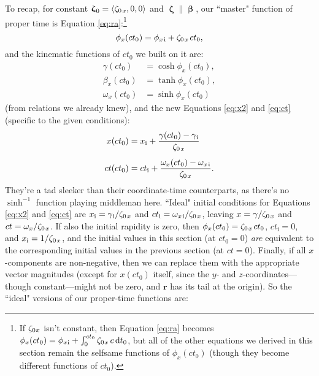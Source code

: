 \documentclass[12pt]{article}
\renewcommand{\vv}[1]{\mathbf{#1}}
\newcommand{\dd}[1]{\mathrm{d}#1}
\newcommand{\vvbeta}{\bm{\upbeta}}
\newcommand{\vvzeta}{\bm{\upzeta}}
\begin{document}
To recap, for constant $\vvzeta_{\mkern1mu 0} = \langle \zeta_{0 \mkern2mu x} , 0, 0 \rangle$ and $\vvzeta \parallel \vvbeta$, our ``master" function of proper time is Equation \ref{eq:ra}:\footnote{If $\zeta_{0 \mkern1mu x}$ isn't constant, then Equation \ref{eq:ra} becomes $\phi_x (ct_0) = \phi_{x \mkern1mu \textrm{i} } + \int_0^{ct_0} \zeta_{0 \mkern1mu x} \, c \, \dd t_0$, but all of the other equations we derived in this section remain the selfsame functions of $\phi_x (ct_0)$ (though they become different functions of $ct_0$).}
\begin{equation*}
\phi_x (ct_0) = \phi_{x \mkern2mu \textrm{i} } + \zeta_{0 \mkern2mu x} \mkern2mu ct_0 ,
\end{equation*}
and the kinematic functions of $ct_0$ we built on it are:
\begin{equation*}
\begin{aligned}
\gamma (ct_0) &= \cosh{\phi_x (ct_0)}  , \\[3pt]
\beta_x (ct_0) &= \tanh{\phi_x (ct_0)}  , \\[3pt]
\omega_x (ct_0) &= \sinh{\phi_x (ct_0)} 
\end{aligned}
\end{equation*}
(from relations we already knew), and the new Equations \ref{eq:x2} and \ref{eq:ct} (specific to the given conditions):
\begin{equation*}
\begin{aligned}
x(ct_0) &= x_{\mathrm{i}} + \dfrac{\gamma(ct_0) - \gamma_{\mkern1mu \mathrm{i}}}{ \zeta_{0 \mkern2mu x}} \\[5pt]
ct(ct_0) &= ct_{\mathrm{i}} + \dfrac{\omega_x (ct_0) - \omega_{x \mkern2mu \textrm{i} }}{ \zeta_{0 \mkern2mu x}} .
\end{aligned}
\end{equation*}
They're a tad sleeker than their coordinate-time counterparts, as there's no $\sinh^{-1}$ function playing middleman here. ``Ideal" initial conditions for Equations \ref{eq:x2} and \ref{eq:ct} are $x_{\mathrm{i}} = \gamma_{\mkern1mu \mathrm{i}} / \zeta_{0 \mkern2mu x}$ and $ct_{\mathrm{i}} = \omega_{x \mkern2mu \textrm{i} } / \zeta_{0 \mkern2mu x}$, leaving $x = \gamma / \zeta_{0 \mkern2mu x}$ and $ct = \omega_x / \zeta_{0 \mkern2mu x}$. If also the initial rapidity is zero, then $\phi_x (ct_0) = \zeta_{0 \mkern2mu x} \mkern2mu ct_0$, $ct_{\mathrm{i}} = 0$, and $x_{\mathrm{i}} = 1 / \zeta_{0 \mkern2mu x}$, and the initial values in this section (at $ct_0 = 0$) \emph{are} equivalent to the corresponding initial values in the previous section (at $ct = 0$). Finally, if all $x$-components are non-negative, then we can replace them with the appropriate vector magnitudes (except for $x (ct_0)$ itself, since the $y$- and $z$-coordinates---though constant---might not be zero, and $\vv r$ has its tail at the origin). So the ``ideal" versions of our proper-time functions are:
\end{document}
